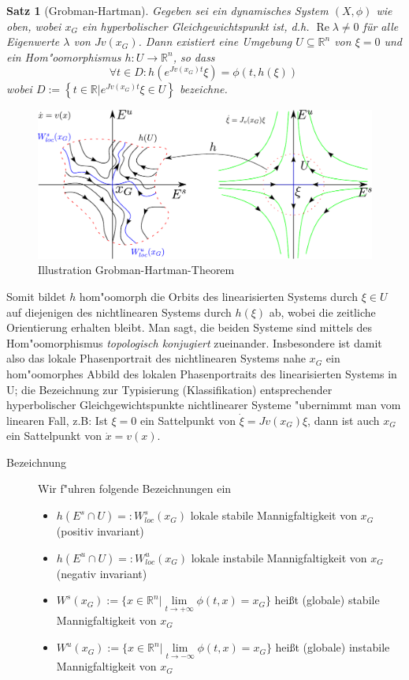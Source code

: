 \documentclass[a4paper, 13pt]{scrreprt}
\newtheorem{satz}{Satz}[section]
\theoremstyle{definition} \newtheorem{definition}{Definition}[section]
\newcommand{\RR}{\mathbb{R}}
\begin{document}
\begin{satz}[Grobman-Hartman]\label{Grobman-Hartman}
Gegeben sei ein dynamisches System $(X,\phi)$ wie oben, wobei $x_G$ ein hyperbolischer Gleichgewichtspunkt ist, d.h. $\operatorname{Re}\lambda \neq 0$ für alle Eigenwerte $\lambda$ von $Jv(x_G)$. Dann existiert eine Umgebung $U\subseteq \RR^n$ von $\xi =0$ und ein Hom"oomorphismus $h:U\to\mathbb{R}^n$, so dass \[ \forall t\in D: h(e^{Jv(x_G)t}\xi)=\phi(t,h(\xi))\ \] wobei $D := \left \{ \left . t \in \RR \right| e^{Jv(x_G)t}\xi \in U \right \}$ bezeichne.
\end{satz}
\begin{figure}[htpb]
		\centering
		\includegraphics[width=1\textwidth]{img/grobman-hartman.pdf}
		\caption{Illustration Grobman-Hartman-Theorem}
\end{figure}

Somit bildet $h$ hom"oomorph die Orbits des linearisierten Systems durch $\xi\in U$ auf diejenigen des nichtlinearen Systems durch $h(\xi)$ ab, wobei die zeitliche Orientierung erhalten bleibt. Man sagt, die beiden Systeme sind mittels des Hom"oomorphismus \emph{topologisch konjugiert} zueinander. Insbesondere ist damit also das lokale Phasenportrait des nichtlinearen Systems nahe $x_G$ ein hom"oomorphes Abbild des lokalen Phasenportraits des linearisierten Systems in U; die Bezeichnung zur Typisierung (Klassifikation) entsprechender hyperbolischer Gleichgewichtspunkte nichtlinearer Systeme "ubernimmt man vom linearen Fall, z.B: Ist $\xi =0$ ein Sattelpunkt von $\dot{\xi}=Jv(x_G)\xi$, dann ist auch $x_G$ ein Sattelpunkt von $\dot{x}=v(x)$.

\begin{description}
\item[Bezeichnung]Wir f"uhren folgende Bezeichnungen ein
\begin{itemize}
\item $h(E^s\cap U)=: W_{loc}^s(x_G)$ lokale stabile Mannigfaltigkeit von $x_G$ (positiv invariant)\\
\item $h(E^u\cap U)=: W_{loc}^u(x_G)$ lokale instabile Mannigfaltigkeit von $x_G$ (negativ invariant)\\
\item $W^s(x_G):=\{x\in\mathbb{R}^n|\lim\limits_{t\to +\infty}\phi (t,x)=x_G\}$ heißt (globale) stabile Mannigfaltigkeit von $x_G$\\
\item $W^u(x_G):=\{x\in\mathbb{R}^n|\lim\limits_{t\to -\infty}\phi (t,x)=x_G\}$ heißt (globale) instabile Mannigfaltigkeit von $x_G$
\end{itemize}
\end{description}
\end{document}
